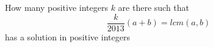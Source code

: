 How many positive integers $k$ are there such that \[\dfrac k{2013}(a+b)=lcm(a,b)\] has a solution in positive integers 